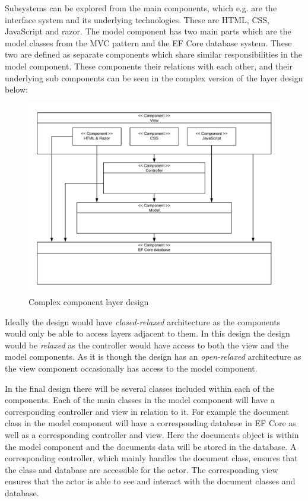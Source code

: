 Subsystems can be explored from the main components, which e.g. are the interface system and its underlying technologies.
These are HTML, CSS, JavaScript and razor.
The model component has two main parts which are the model classes from the MVC pattern and the EF Core database system.
These two are defined as separate components which share similar responsibilities in the model component.
These components their relations with each other, and their underlying sub components can be seen in the complex version of the layer design below:

\begin{figure}[H]
	\centering
	\includegraphics[width=1\textwidth]{billeder/complexcomponents.jpeg}
	\caption{Complex component layer design}
\end{figure}

Ideally the design would have \textit{closed-relaxed} architecture as the components would only be able to access layers adjacent to them.
In this design the design would be \textit{relaxed} as the controller would have access to both the view and the model components.
As it is though the design has an \textit{open-relaxed} architecture as the view component occasionally has access to the model component.

In the final design there will be several classes included within each of the components.
Each of the main classes in the model component will have a corresponding controller and view in relation to it.
For example the document class in the model component will have a corresponding database in EF Core as well as a corresponding controller and view.
Here the documents object is within the model component and the documents data will be stored in the database.
A corresponding controller, which mainly handles the document class, ensures that the class and database are accessible for the actor.
The corresponding view ensures that the actor is able to see and interact with the document classes and database.
